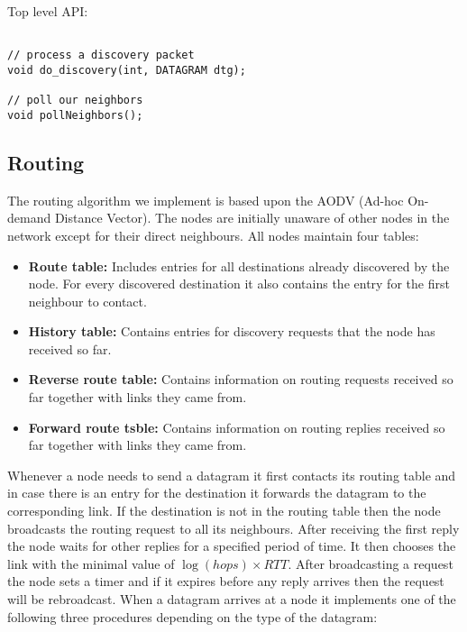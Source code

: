 \documentclass[11pt,a4paper,oneside]{report}
\begin{document}
Top level API: 
\begin{lstlisting}

// process a discovery packet
void do_discovery(int, DATAGRAM dtg);

// poll our neighbors
void pollNeighbors();
\end{lstlisting}
\subsection*{Routing}

The routing algorithm we implement is based upon the AODV (Ad-hoc On-demand
Distance Vector). The nodes are initially unaware of other nodes in the network except 
for their direct neighbours. All nodes maintain four tables: 
\begin{itemize}
\item \noindent \textbf{Route table:}
 Includes entries for
all destinations already discovered by the node.  For every discovered
destination it also contains the entry for the first neighbour to contact.
\item \noindent \textbf{History table:}
 Contains entries for discovery requests that the node has received so
far.
\item \noindent \textbf{Reverse route table:}
Contains information on routing requests received so far together with links they came from.
\item \noindent \textbf{Forward route tsble:} 
Contains information on routing replies received so far together with links they came from.
 
\end{itemize}
Whenever a node needs to send a datagram it first contacts its 
routing table and in case there is an entry for the destination it forwards the 
datagram to the corresponding link. If the destination is not in the routing table
then the node broadcasts the routing request to all its neighbours. After receiving the first reply the node waits for other replies for a specified period of time. It then chooses the link with the
minimal value of $\log(hops) \times RTT$. After broadcasting a request the node sets a timer and
if it expires before any reply arrives then the request will be rebroadcast. When a datagram arrives at a node it implements 
one of the following three procedures depending on the type of the datagram:
\end{document}
